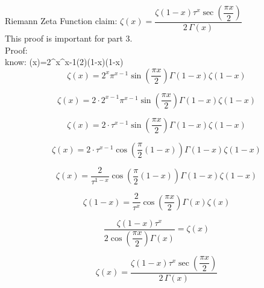 \documentclass[12pt]{article}
\begin{document}
\pagebreak
\begin{section}{Riemann Zeta Function}
	claim: $\zeta(x)=\dfrac{\zeta(1-x)\tau^x\sec\left(\dfrac{\pi x}2\right)}{2\,\Gamma(x)}$\\
	This proof is important for part 3.\\
	Proof:\\
	know: \zeta(x)=2^x\pi^{x-1}\sin\left(2\right)\Gamma(1-x)\zeta(1-x)\\

	\begin{equation}
		\zeta(x)=2^x\pi^{x-1}\sin\left(\dfrac{\pi x}2\right)\Gamma\left(1-x\right)\zeta\left(1-x\right)
	\end{equation}

	\begin{equation}
		\zeta(x)=2\cdot2^{x-1}\pi^{x-1}\sin\left(\dfrac{\pi x}2\right)\Gamma(1-x)\zeta(1-x)
	\end{equation}

	\begin{equation}
		\zeta(x)=2\cdot\tau^{x-1}\sin\left(\dfrac{\pi x}2\right)\Gamma(1-x)\zeta(1-x)
	\end{equation}

	\begin{equation}
		\zeta(x)=2\cdot\tau^{x-1}\cos\left(\dfrac\pi2(1-x)\right)\Gamma(1-x)\zeta(1-x)
	\end{equation}

	\begin{equation}
		\zeta(x)=\dfrac2{\tau^{1-x}}\cos\left(\dfrac\pi2(1-x)\right)\Gamma(1-x)\zeta(1-x)
	\end{equation}

	\begin{equation}
		\zeta(1-x)=\dfrac2{\tau^x}\cos\left(\dfrac{\pi x}2\right)\Gamma(x)\zeta(x)
	\end{equation}

	\begin{equation}
		\dfrac{\zeta(1-x)\tau^x}{2\cos\left(\dfrac{\pi x}2\right)\Gamma(x)}=\zeta(x)
	\end{equation}

	\begin{equation}
		\zeta(x)=\dfrac{\zeta(1-x)\tau^x\sec\left(\dfrac{\pi x}2\right)}{2\,\Gamma(x)}
	\end{equation}

	\noindent\blacksquare
\end{section}
\end{document}
